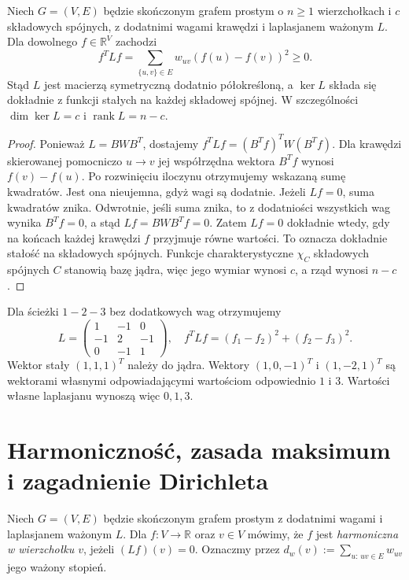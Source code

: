 \begin{samepage}
\begin{twierdzenie}
\label{thm:tg-energy}
Niech $G=(V,E)$ będzie skończonym grafem prostym
o $n\geq1$ wierzchołkach i $c$ składowych spójnych,
z dodatnimi wagami krawędzi i laplasjanem ważonym $L$.
Dla dowolnego $f\in\mathbb R^V$ zachodzi
\[
f^TLf=\sum_{\{u,v\}\in E}w_{uv}(f(u)-f(v))^2\ge0.
\]
Stąd $L$ jest macierzą symetryczną dodatnio półokreśloną, a
$\ker L$ składa się dokładnie z funkcji stałych na każdej
składowej spójnej. W szczególności $\dim\ker L=c$ i
$\operatorname{rank}L=n-c$.
\end{twierdzenie}
\end{samepage}

\begin{proof}
Ponieważ $L=BWB^T$, dostajemy
$f^TLf=(B^Tf)^TW(B^Tf)$. Dla krawędzi skierowanej
pomocniczo $u\to v$ jej współrzędna wektora $B^Tf$
wynosi $f(v)-f(u)$. Po rozwinięciu iloczynu otrzymujemy
wskazaną sumę kwadratów. Jest ona nieujemna, gdyż wagi są
dodatnie. Jeżeli $Lf=0$, suma kwadratów znika.
Odwrotnie, jeśli suma znika, to z dodatniości wszystkich
wag wynika $B^Tf=0$, a stąd $Lf=BWB^Tf=0$.
Zatem $Lf=0$ dokładnie wtedy, gdy na końcach każdej
krawędzi $f$ przyjmuje równe wartości.
To oznacza dokładnie stałość na składowych spójnych.
Funkcje charakterystyczne $\chi_C$ składowych spójnych $C$ stanowią bazę jądra, więc jego wymiar wynosi
$c$, a rząd wynosi $n-c$.
\end{proof}

\begin{przyklad}
Dla ścieżki $1-2-3$ bez dodatkowych wag otrzymujemy
\[
L=\begin{pmatrix}1&-1&0\\-1&2&-1\\0&-1&1\end{pmatrix},
\quad
f^TLf=(f_1-f_2)^2+(f_2-f_3)^2.
\]
Wektor stały $(1,1,1)^T$ należy do jądra.
Wektory $(1,0,-1)^T$ i $(1,-2,1)^T$ są wektorami własnymi
odpowiadającymi wartościom odpowiednio $1$ i $3$.
Wartości własne laplasjanu wynoszą więc $0,1,3$.
\end{przyklad}

\section{Harmoniczność, zasada maksimum i zagadnienie Dirichleta}
\label{sec:tg-harmonic}

\begin{definicja}
Niech $G=(V,E)$ będzie skończonym grafem prostym
z dodatnimi wagami i laplasjanem ważonym $L$.
Dla $f:V\to\mathbb R$ oraz $v\in V$ mówimy, że $f$ jest \emph{harmoniczna w wierzchołku $v$},
jeżeli $(Lf)(v)=0$. Oznaczmy przez $d_w(v):=\sum_{u:\,uv\in E}w_{uv}$
jego ważony stopień.
\end{definicja}

